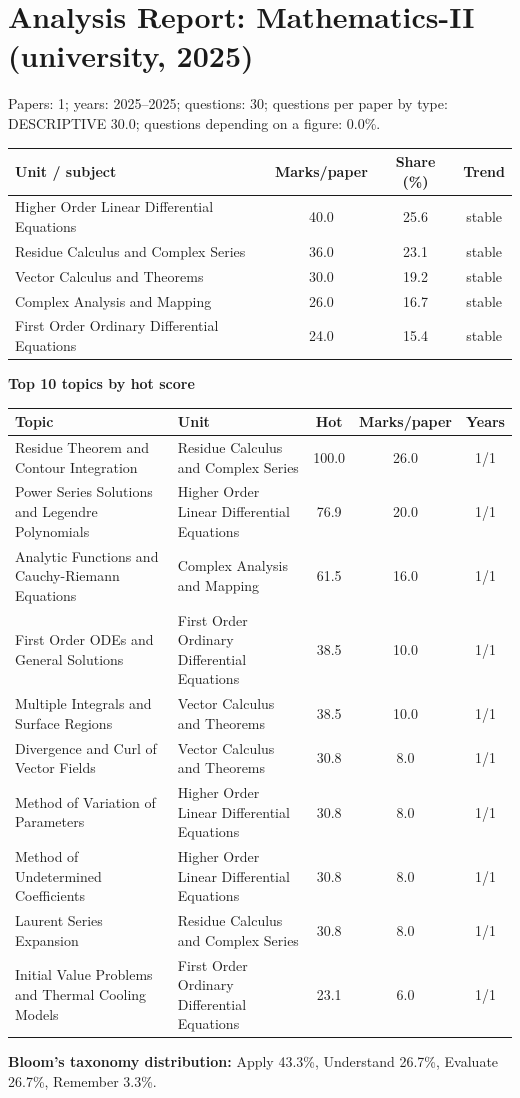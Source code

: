 \section{Analysis Report: Mathematics-II (university, 2025)}
Papers: 1; years: 2025--2025; questions: 30; questions per paper by type: DESCRIPTIVE 30.0; questions depending on a figure: 0.0\%.
\begin{center}\small\begin{tabular}{@{}lccc@{}}\toprule \textbf{Unit / subject} & \textbf{Marks/paper} & \textbf{Share (\%)} & \textbf{Trend}\\\midrule
Higher Order Linear Differential Equations & 40.0 & 25.6 & stable\\
Residue Calculus and Complex Series & 36.0 & 23.1 & stable\\
Vector Calculus and Theorems & 30.0 & 19.2 & stable\\
Complex Analysis and Mapping & 26.0 & 16.7 & stable\\
First Order Ordinary Differential Equations & 24.0 & 15.4 & stable\\
\bottomrule\end{tabular}\end{center}
\noindent\textbf{Top 10 topics by hot score}\par\smallskip
{\small\begin{longtable}{@{}p{6.4cm}p{3.6cm}ccc@{}}\toprule \textbf{Topic} & \textbf{Unit} & \textbf{Hot} & \textbf{Marks/paper} & \textbf{Years}\\\midrule\endhead
Residue Theorem and Contour Integration & Residue Calculus and Complex Series & 100.0 & 26.0 & 1/1\\
Power Series Solutions and Legendre Polynomials & Higher Order Linear Differential Equations & 76.9 & 20.0 & 1/1\\
Analytic Functions and Cauchy-Riemann Equations & Complex Analysis and Mapping & 61.5 & 16.0 & 1/1\\
First Order ODEs and General Solutions & First Order Ordinary Differential Equations & 38.5 & 10.0 & 1/1\\
Multiple Integrals and Surface Regions & Vector Calculus and Theorems & 38.5 & 10.0 & 1/1\\
Divergence and Curl of Vector Fields & Vector Calculus and Theorems & 30.8 & 8.0 & 1/1\\
Method of Variation of Parameters & Higher Order Linear Differential Equations & 30.8 & 8.0 & 1/1\\
Method of Undetermined Coefficients & Higher Order Linear Differential Equations & 30.8 & 8.0 & 1/1\\
Laurent Series Expansion & Residue Calculus and Complex Series & 30.8 & 8.0 & 1/1\\
Initial Value Problems and Thermal Cooling Models & First Order Ordinary Differential Equations & 23.1 & 6.0 & 1/1\\
\bottomrule\end{longtable}}
\noindent\textbf{Bloom's taxonomy distribution:} Apply 43.3\%, Understand 26.7\%, Evaluate 26.7\%, Remember 3.3\%.\par

